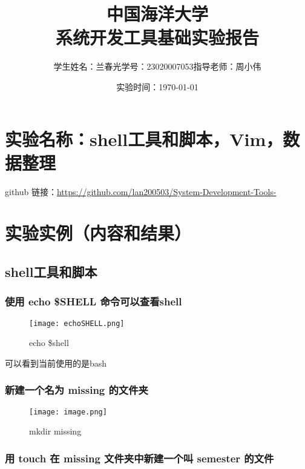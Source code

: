 \documentclass{ctexart}
\begin{document}
\title{中国海洋大学\\系统开发工具基础实验报告}
\author{学生姓名：兰春光\hspace{20}学号：23020007053\hspace{20}指导老师：周小伟}
\date{\hspace{5}实验时间：\today}
\maketitle
\footnotesize\tableofcontents




\section{实验名称：shell工具和脚本，Vim，数据整理}

github 链接：\href{URL}{https://github.com/lan200503/System-Development-Tools-}


\section{实验实例（内容和结果）}

\subsection{shell工具和脚本}

\subsubsection{使用 echo \$SHELL 命令可以查看shell}
\begin{figure}[H]
    \centering
    \texttt{[image: echoSHELL.png]}
    \caption{echo \$shell}
    \label{fig:enter-label}
\end{figure}
可以看到当前使用的是bash

\subsubsection{新建一个名为 missing 的文件夹}
\begin{figure}[H]
    \centering
    \texttt{[image: image.png]}
    \caption{mkdir missing}
    \label{fig:enter-label}
\end{figure}

\subsubsection{用 touch 在 missing 文件夹中新建一个叫 semester 的文件}
\end{document}
